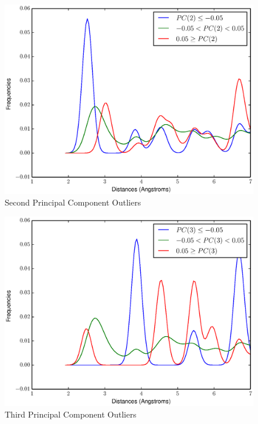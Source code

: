 \documentclass[12pt,letterpaper]{article}
\begin{document}
\begin{figure}[ht]
  \begin{center}
    \includegraphics[scale=0.8]{figs/eigenOutlier2.eps}
    \caption{Second Principal Component Outliers}
  \end{center}
\end{figure}

\begin{figure}[ht]
  \begin{center}
    \includegraphics[scale=0.8]{figs/eigenOutlier3.eps}
    \caption{Third Principal Component Outliers}
  \end{center}
\end{figure}
\end{document}
